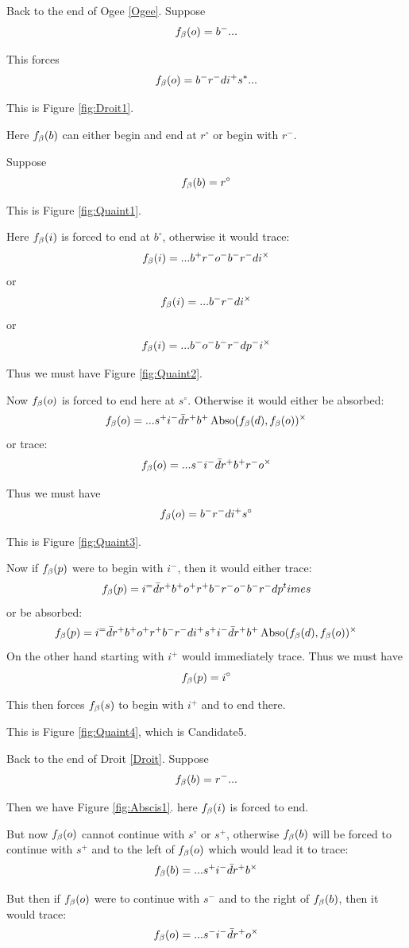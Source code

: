 \label{Droit}
Back to the end of Ogee \ref{Ogee}. Suppose
\[
f_\beta(o) = b^-...
\]

This forces
\[
f_\beta(o) = b^- r^- d i^+ s^*...
\]

This is Figure \ref{fig:Droit1}.

Here $f_\beta(b)$ can either begin and end at $r^\circ$ or begin with $r^-$.

\label{Quaint}
Suppose 
\[
f_\beta(b) = r^\circ
\]

This is Figure \ref{fig:Quaint1}.

Here $f_\beta(i)$ is forced to end at $b^\circ$, otherwise it would trace:
\[
f_\beta(i) = ...b^+ r^- o^- b^- r^- d i^\times
\]
or
\[
f_\beta(i) = ...b^- r^- d i^\times
\]
or
\[
f_\beta(i) = ...b^- o^- b^- r^- d p^- i^\times
\]

Thus we must have Figure \ref{fig:Quaint2}.

Now $f_\beta(o)$ is forced to end here at $s^\circ$. Otherwise it would either be absorbed:
\[
f_\beta(o) = ...s^+ i^- \bar{d} r^+ b^+ \operatorname{Abso}(f_\beta(d), f_\beta(o))^\times
\]
or trace:
\[
f_\beta(o) = ... s^- i^- \bar{d} r^+ b^+ r^- o^\times
\]

Thus we must have
\[
f_\beta(o) = b^- r^- d i^+ s^\circ
\]

This is Figure \ref{fig:Quaint3}. 

Now if $f_\beta(p)$ were to begin with $i^-$, then it would either trace:
\[
f_\beta(p) = i^= \bar{d} r^+ b^+ o^+ r^+ b^- r^- o^- b^- r^- d p^times
\]
or be absorbed:
\[
f_\beta(p) = i^= \bar{d} r^+ b^+ o^+ r^+ b^- r^- d i^+ s^+ i^- \bar{d} r^+ b^+ \operatorname{Abso}(f_\beta(d), f_\beta(o))^\times
\]
On the other hand starting with $i^+$ would immediately trace. Thus we must have
\[
f_\beta(p) = i^\circ
\]

This then forces $f_\beta(s)$ to begin with $i^+$ and to end there. 

This is Figure \ref{fig:Quaint4}, which is Candidate5.

\label{Abscis}
Back to the end of Droit \ref{Droit}. Suppose
\[
f_\beta(b) = r^-...
\]

Then we have Figure \ref{fig:Abscis1}. here $f_\beta(i)$ is forced to end.

But now $f_\beta(o)$ cannot continue with $s^\circ$ or $s^+$, otherwise $f_\beta(b)$ will be forced to continue with $s^+$ and to the left of $f_\beta(o)$ which would lead it to trace:
\[
f_\beta(b) = ...s^+ i^- \bar{d} r^+ b^\times
\]

But then if $f_\beta(o)$ were to continue with $s^-$ and to the right of $f_\beta(b)$, then it would trace:
\[
f_\beta(o) = ... s^- i^- \bar{d} r^+ o^\times
\]

